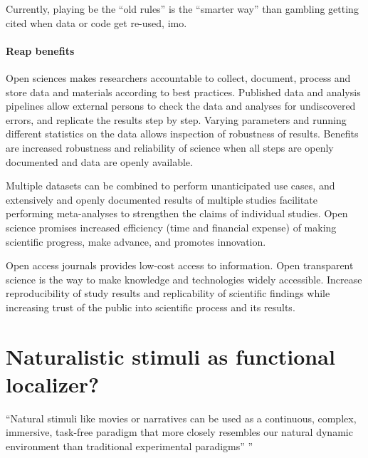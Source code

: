 %
Currently, playing be the ``old rules'' is the ``smarter way'' than gambling
getting cited when data or code get re-used, imo.



\paragraph{Reap benefits}

%
Open sciences makes researchers accountable to collect, document, process and
store data and materials according to best practices.
%
Published data and analysis pipelines allow external persons to check the data
and analyses for undiscovered errors, and replicate the results step by step.
%
Varying parameters and running different statistics on the data allows
inspection of robustness of results.
%
Benefits are increased robustness and reliability of science when all steps are
openly documented and data are openly available.

%
Multiple datasets can be combined to perform unanticipated use cases, and
extensively and openly documented results of multiple studies facilitate
performing meta-analyses to strengthen the claims of individual studies.
%
Open science promises increased efficiency (time and financial expense) of
making scientific progress, make advance, and promotes innovation.

%
Open access journals provides low-cost access to information.
%
Open transparent science is the way to make knowledge and technologies
widely accessible.
%
Increase reproducibility of study results and replicability of scientific
findings while increasing trust of the public into scientific process and its
results.



\pagebreak



\section{Naturalistic stimuli as functional localizer?}



``Natural stimuli like movies \citep{eickhoff2020towards,
hasson2008neurocinematics, sonkusare2019naturalistic} or narratives
\citep{hamilton2018revolution, honey2012not, lerner2011topographic,
silbert2014coupled, wilson2008beyond} can be used as a continuous, complex,
immersive, task-free paradigm that more closely resembles our natural dynamic
environment than traditional experimental paradigms''
\citep{haeusler2022processing}''


